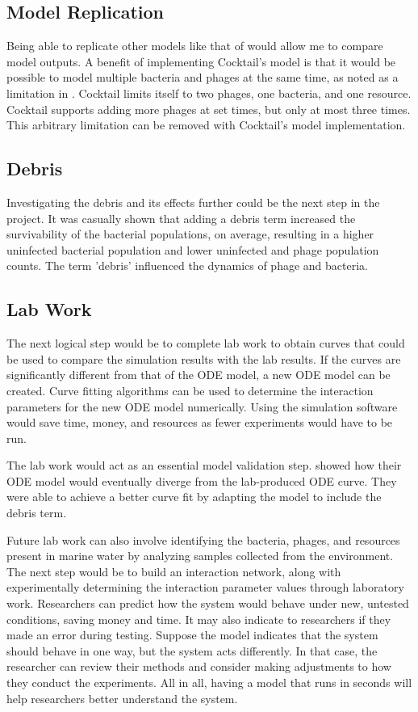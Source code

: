\subsection{Model Replication}
Being able to replicate other models like that of \citet{nilssonCocktailComputerProgram2022} would allow me to compare model outputs. 
A benefit of implementing Cocktail's model is that it would be possible to model multiple bacteria and phages at the same time, as noted as a limitation in . 
Cocktail limits itself to two phages, one bacteria, and one resource. 
Cocktail supports adding more phages at set times, but only at most three times. 
This arbitrary limitation can be removed with Cocktail's model implementation. 

\subsection{Debris}
Investigating the debris and its effects further could be the next step in the project. 
It was casually shown that adding a debris term increased the survivability of the bacterial populations, on average, resulting in a higher uninfected bacterial population and lower uninfected and phage population counts. 
The term 'debris' influenced the dynamics of phage and bacteria. 

\subsection{Lab Work}
The next logical step would be to complete lab work to obtain curves that could be used to compare the simulation results with the lab results. 
If the curves are significantly different from that of the ODE model, a new ODE model can be created. 
Curve fitting algorithms can be used to determine the interaction parameters for the new ODE model numerically. 
Using the simulation software would save time, money, and resources as fewer experiments would have to be run. 

The lab work would act as an essential model validation step. 
\citet{deyEmergentHigherorderInteractions2025} showed how their ODE model would eventually diverge from the lab-produced ODE curve. 
They were able to achieve a better curve fit by adapting the model to include the debris term. 

Future lab work can also involve identifying the bacteria, phages, and resources present in marine water by analyzing samples collected from the environment. 
The next step would be to build an interaction network, along with experimentally determining the interaction parameter values through laboratory work. 
Researchers can predict how the system would behave under new, untested conditions, saving money and time. 
It may also indicate to researchers if they made an error during testing. 
Suppose the model indicates that the system should behave in one way, but the system acts differently. In that case, the researcher can review their methods and consider making adjustments to how they conduct the experiments. 
All in all, having a model that runs in seconds will help researchers better understand the system. 

